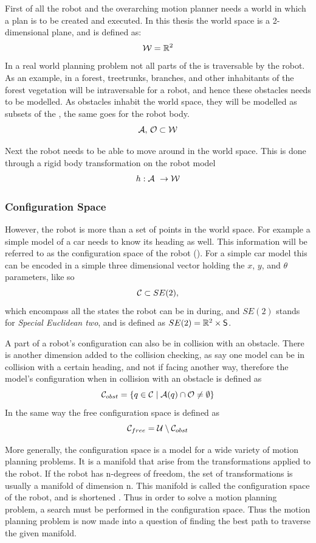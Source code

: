 First of all the robot and the overarching motion planner needs a world in which
a plan is to be created and executed. In this thesis the world space is a
2-dimensional plane, and is defined as:
\[
  \mathcal{W} = \mathbb{R}^2
\]
In a real world planning problem not all parts of the \modelworld{} is
traversable by the robot. As an example, in a forest, treetrunks, branches, and
other inhabitants of the forest vegetation will be intraversable for a robot,
and hence these obstacles needs to be modelled. As obstacles inhabit the world
space, they will be modelled as subsets of the \modelworld, the same goes for
the robot body.
\[
  \mathcal{A},\, \mathcal{O} \subset \mathcal{W}
\]

Next the robot needs to be able to move around in the world space. This is done
through a rigid body transformation on the robot model
\[
  h : \mathcal{A}\ \rightarrow \mathcal{W}
\]


\subsubsection{Configuration Space}

However, the robot is more than a set of points in the world space. For example
a simple model of a car needs to know its heading as well. This information will
be referred to as the configuration space of the robot
(\modelconfigurationspace). For a simple car model this can be encoded in a
simple three dimensional vector holding the \(x\), \(y\), and \(\theta\)
parameters, like so
\[
  \mathcal{C} \subset SE(2),
\]
which encompass all the states the robot can be in during, and \(SE(2)\) stands
for \textit{Special Euclidean two}, and is defined as \(SE(2) = \mathbb{R}^2 \times
\mathsf{S}\).

A part of a robot's configuration can also be in collision with an obstacle.
There is another dimension added to the collision checking, as say one model can
be in collision with a certain heading, and not if facing another way, therefore
the model's configuration when in collision with an obstacle is defined as
\[
  \mathcal{C}_{obst}{} = \lbrace q \in \mathcal{C}{} \mid
    \mathcal{A}(q) \cap \mathcal{O}{} \neq \emptyset\rbrace
\]
In the same way the free configuration space is defined as
\[
  \mathcal{C}_{free}{} = \mathcal{U} \setminus
  \mathcal{C}_{obst}{}
\]

More generally, the configuration space is a model for a wide variety of motion
planning problems. It is a manifold that arise from the transformations applied
to the robot. If the robot has n-degrees of freedom, the set of transformations
is usually a manifold of dimension n. This manifold is called the configuration
space of the robot, and is shortened \modelconfigurationspace{}. Thus in order
to solve a motion planning problem, a search must be performed in the
configuration space. Thus the motion planning problem is now made into a
question of finding the best path to traverse the given manifold\cite{Lav06}.

